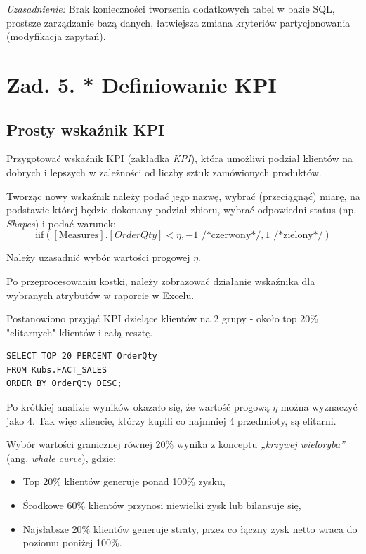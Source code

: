 \documentclass[a4paper,12pt]{article}
\begin{document}
\textit{Uzasadnienie:} Brak konieczności tworzenia dodatkowych tabel w bazie SQL, prostsze zarządzanie bazą danych, łatwiejsza zmiana kryteriów partycjonowania (modyfikacja zapytań).

\section{Zad. 5. * Definiowanie KPI}

\subsection{Prosty wskaźnik KPI}

Przygotować wskaźnik KPI (zakładka \textit{KPI}), która umożliwi podział klientów na dobrych i lepszych w zależności od liczby sztuk zamówionych produktów.

Tworząc nowy wskaźnik należy podać jego nazwę, wybrać (przeciągnąć) miarę, na podstawie której będzie dokonany podział zbioru, wybrać odpowiedni status (np. \textit{Shapes}) i podać warunek:
\[
  \text{iif}([\text{Measures}].[OrderQty] < \eta, -1 \text{ /*czerwony*/}, 1 \text{ /*zielony*/})
\]

Należy uzasadnić wybór wartości progowej $\eta$.

Po przeprocesowaniu kostki, należy zobrazować działanie wskaźnika dla wybranych atrybutów w raporcie w Excelu.

Postanowiono przyjąć KPI dzielące klientów na 2 grupy - około top 20\% "elitarnych" klientów i całą resztę.

\begin{lstlisting}[caption={Kwerenda znajdująca dane do wyliczenia KPI}]
SELECT TOP 20 PERCENT OrderQty
FROM Kubs.FACT_SALES
ORDER BY OrderQty DESC;
\end{lstlisting}

Po krótkiej analizie wyników okazało się, że wartość progową $\eta$ można wyznaczyć jako 4. Tak więc kliencie, którzy kupili co najmniej 4 przedmioty, są elitarni.

Wybór wartości granicznej równej 20\% wynika z konceptu \textit{„krzywej wieloryba”} (ang. \textit{whale curve}), gdzie:
\begin{itemize}
  \item Top 20\% klientów generuje ponad 100\% zysku,
  \item Środkowe 60\% klientów przynosi niewielki zysk lub bilansuje się,
  \item Najsłabsze 20\% klientów generuje straty, przez co łączny zysk netto wraca do poziomu poniżej 100\%.
\end{itemize}
\end{document}
